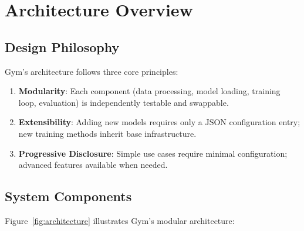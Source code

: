 \section{Architecture Overview}


\subsection{Design Philosophy}

Gym's architecture follows three core principles:

\begin{enumerate}
\item \textbf{Modularity}: Each component (data processing, model loading, training loop, evaluation) is independently testable and swappable.
\item \textbf{Extensibility}: Adding new models requires only a JSON configuration entry; new training methods inherit base infrastructure.
\item \textbf{Progressive Disclosure}: Simple use cases require minimal configuration; advanced features available when needed.
\end{enumerate}

\subsection{System Components}

Figure~\ref{fig:architecture} illustrates Gym's modular architecture:

